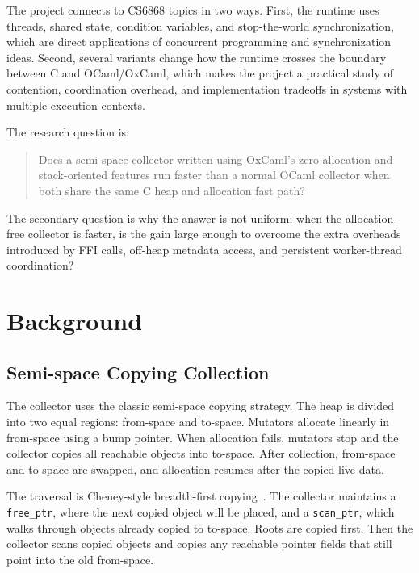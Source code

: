\documentclass[11pt,a4paper]{article}
\begin{document}
The project connects to CS6868 topics in two ways. First, the runtime uses
threads, shared state, condition variables, and stop-the-world synchronization,
which are direct applications of concurrent programming and synchronization
ideas. Second, several variants change how the runtime crosses the boundary
between C and OCaml/OxCaml, which makes the project a practical study of
contention, coordination overhead, and implementation tradeoffs in systems with
multiple execution contexts.

The research question is:

\begin{quote}
Does a semi-space collector written using OxCaml's zero-allocation and
stack-oriented features run faster than a normal OCaml collector when both share
the same C heap and allocation fast path?
\end{quote}

The secondary question is why the answer is not uniform: when the
allocation-free collector is faster, is the gain large enough to overcome the
extra overheads introduced by FFI calls, off-heap metadata access, and
persistent worker-thread coordination?

\section{Background}
\label{sec:background}

\subsection{Semi-space Copying Collection}

The collector uses the classic semi-space copying strategy. The heap is divided
into two equal regions: from-space and to-space. Mutators allocate linearly in
from-space using a bump pointer. When allocation fails, mutators stop and the
collector copies all reachable objects into to-space. After collection,
from-space and to-space are swapped, and allocation resumes after the copied
live data.

The traversal is Cheney-style breadth-first copying~\cite{cheney1970}. The
collector maintains a \texttt{free\_ptr}, where the next copied object will be
placed, and a \texttt{scan\_ptr}, which walks through objects already copied to
to-space. Roots are copied first. Then the collector scans copied objects and
copies any reachable pointer fields that still point into the old from-space.
\end{document}

